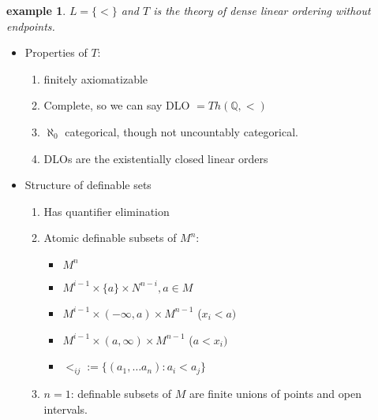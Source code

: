 \documentclass[letterpaper, 12pt]{article}
\newcommand{\fin}{\qquad \quad \hfill \framebox[1.75mm][l]{\,}}
\newcommand{\bQ}{\mathbb{Q}}
\theoremstyle{stdthm}
\theoremstyle{stddef}
\newtheorem{eg}[thm]{example} %
\theoremstyle{stdnonum}
\theoremstyle{stdqands}
\theoremstyle{stdbold}
\begin{document}


\begin{eg}
$L = \{<\}$ and $T$ is the theory of dense linear ordering without endpoints. 
\end{eg}
\begin{itemize}
\item Properties of $T$: 
\begin{enumerate}
\item finitely axiomatizable
\item Complete, so we can say DLO $ = Th(\bQ,<)$
\item $\aleph_0$ categorical, though not uncountably categorical.
\item DLOs are the existentially closed linear orders 
\end{enumerate}
\item Structure of definable sets
\begin{enumerate}
\item Has quantifier elimination
\item Atomic definable subsets of $M^n$:
\begin{itemize}
\item $M^n$
\item $M^{i-1}\times \{a\} \times N^{n-i}, a \in M$ 
\item $M^{i-1}\times (-\infty, a) \times M^{n-1}$ ($x_i < a)$ 
\item $M^{i-1}\times (a, \infty) \times M^{n-1}$ ($a < x_i)$
\item $<_{ij}:= \{(a_1,\dots a_n): a_i < a_j\}$
\end{itemize}
\item $n=1$: definable subsets of $M$ are finite unions of points and open intervals. 
\end{enumerate}

\end{itemize}
\end{document}
